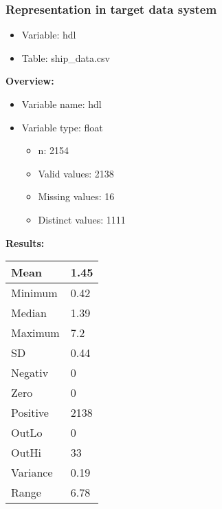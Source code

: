 \documentclass[
]{article}
\providecommand{\tightlist}{%
  \setlength{\itemsep}{0pt}\setlength{\parskip}{0pt}}
\begin{document}
\newpage

\hypertarget{representation-in-target-data-system-12}{%
\subsubsection{\texorpdfstring{Representation in \textbf{target} data
system}{Representation in target data system}}\label{representation-in-target-data-system-12}}

\begin{itemize}
\tightlist
\item
  Variable: hdl
\item
  Table: ship\_data.csv
\end{itemize}

\textbf{Overview:}

\begin{itemize}
\tightlist
\item
  Variable name: hdl
\item
  Variable type: float

  \begin{itemize}
  \tightlist
  \item
    n: 2154
  \item
    Valid values: 2138
  \item
    Missing values: 16
  \item
    Distinct values: 1111
  \end{itemize}
\end{itemize}

\textbf{Results:}\\

\begin{table}[H]
\centering
\begin{tabular}{l|l}
\hline
Mean & 1.45\\
\hline
Minimum & 0.42\\
\hline
Median & 1.39\\
\hline
Maximum & 7.2\\
\hline
SD & 0.44\\
\hline
Negativ & 0\\
\hline
Zero & 0\\
\hline
Positive & 2138\\
\hline
OutLo & 0\\
\hline
OutHi & 33\\
\hline
Variance & 0.19\\
\hline
Range & 6.78\\
\hline
\end{tabular}
\end{table}
\end{document}
